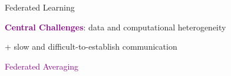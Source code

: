 \documentclass[aspectratio=169,12pt]{beamer}
\begin{document}
\begin{frame}[t]{Federated Learning}


      
  \begin{center}
      \textbf{\textcolor{purple}{Central Challenges}}: data and computational heterogeneity 

      \vspace{-0.5em}
      
      + slow and difficult-to-establish communication
  \end{center}
\end{frame}



\begin{frame}
  \begin{center}
    \huge \textcolor{purple}{
      Federated Averaging
      }
  \end{center}
\end{frame}
\end{document}
